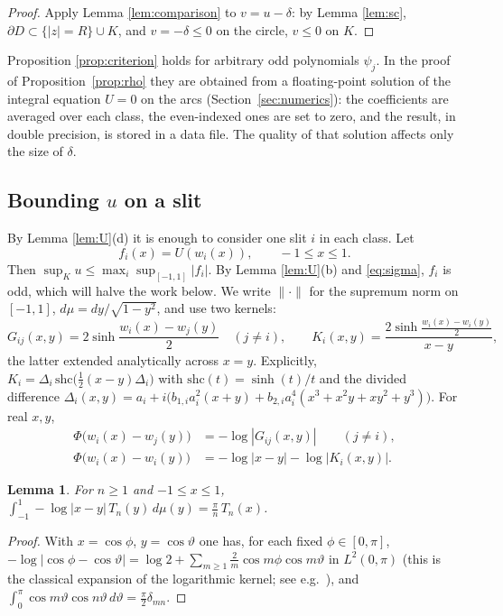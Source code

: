\documentclass[11pt]{amsart}
\newtheorem{lemma}[proposition]{Lemma}
\theoremstyle{remark}
\begin{document}
\begin{proof}
Apply Lemma \ref{lem:comparison} to $v=u-\delta$: by Lemma \ref{lem:sc}, $\partial D\subset\{|z|=R\}\cup K$,
and $v=-\delta\le0$ on the circle, $v\le0$ on $K$.
\end{proof}

Proposition \ref{prop:criterion} holds for arbitrary odd polynomials $\psi_j$. In the proof of
Proposition~\ref{prop:rho} they are obtained from a floating-point solution of the integral equation $U=0$ on
the arcs (Section~\ref{sec:numerics}): the coefficients are averaged over each class, the even-indexed ones are
set to zero, and the result, in double precision, is stored in a data file. The quality of that solution affects
only the size of $\delta$.

\subsection{Bounding $u$ on a slit}

By Lemma \ref{lem:U}(d) it is enough to consider one slit $i$ in each class. Let
\[
f_i(x)=U(w_i(x)),\qquad-1\le x\le1 .
\]
Then $\sup_Ku\le\max_i\sup_{[-1,1]}|f_i|$. By Lemma \ref{lem:U}(b) and \eqref{eq:sigma}, $f_i$ is odd, which
will halve the work below.
We write $\|\cdot\|$ for the supremum norm on $[-1,1]$, $d\mu=dy/\sqrt{1-y^2}$, and use two kernels:
\[
G_{ij}(x,y)=2\sinh\frac{w_i(x)-w_j(y)}2\quad(j\ne i),\qquad
K_i(x,y)=\frac{2\sinh\frac{w_i(x)-w_i(y)}2}{x-y},
\]
the latter extended analytically across $x=y$. Explicitly, $K_i=\Delta_i\,\mathrm{shc}\bigl(\tfrac12(x-y)\Delta_i\bigr)$
with $\mathrm{shc}(t)=\sinh(t)/t$ and the divided difference
$\Delta_i(x,y)=a_i+i\bigl(b_{1,i}a_i^2(x+y)+b_{2,i}a_i^4(x^3+x^2y+xy^2+y^3)\bigr)$. For real $x,y$,
\[
\begin{aligned}\Phi\bigl(w_i(x)-w_j(y)\bigr)&=-\log|G_{ij}(x,y)|\qquad(j\ne i),\\
\Phi\bigl(w_i(x)-w_i(y)\bigr)&=-\log|x-y|-\log|K_i(x,y)| .\end{aligned}
\]

\begin{lemma}\label{lem:logkernel}
For $n\ge1$ and $-1\le x\le1$, $\displaystyle\int_{-1}^{1}-\log|x-y|\,T_n(y)\,d\mu(y)=\frac\pi n\,T_n(x)$.
\end{lemma}

\begin{proof}
With $x=\cos\phi$, $y=\cos\vartheta$ one has, for each fixed $\phi\in[0,\pi]$,
$-\log|\cos\phi-\cos\vartheta|=\log2+\sum_{m\ge1}\frac2m\cos m\phi\cos m\vartheta$ in $L^2(0,\pi)$ (this is the
classical expansion of the logarithmic kernel; see e.g.\ \cite[Chapter~9]{MH}), and
$\int_0^\pi\cos m\vartheta\cos n\vartheta\,d\vartheta=\frac\pi2\delta_{mn}$.
\end{proof}
\end{document}
